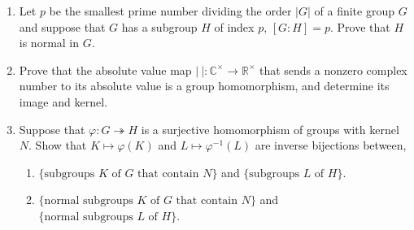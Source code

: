 \documentclass[12pt]{article}
\newcommand{\CC}{{\mathbb C}}
\newcommand{\RR}{{\mathbb R}}
\begin{document}
\begin{enumerate}
\item
      Let $p$ be the smallest prime number dividing the order $|G|$ of a finite group $G$ and
  suppose that $G$ has a subgroup $H$ of index $p$, $[G:H]=p$.
  Prove that $H$ is normal in $G$.

\item  Prove that the absolute value map $\lvert \ \rvert \colon \CC^\times \to \RR^\times$ that sends a nonzero complex
  number to its absolute value is a group homomorphism, and determine its image and kernel.

\item  Suppose that $\varphi\colon G\twoheadrightarrow H$ is a surjective homomorphism of groups with kernel $N$.
  Show that $K\mapsto \varphi(K)$ and $L\mapsto \varphi^{-1}(L)$ are inverse bijections between,
  \begin{enumerate}
  \item $\{\mbox{subgroups $K$ of $G$ that contain $N$}\}$  and
              $\{\mbox{subgroups $L$ of $H$}\}$.

  \item $\{\mbox{normal subgroups $K$ of $G$ that contain $N$}\}$  and
              $\{\mbox{normal subgroups $L$ of $H$}\}$.

  \end{enumerate}

\end{enumerate}
\end{document}
